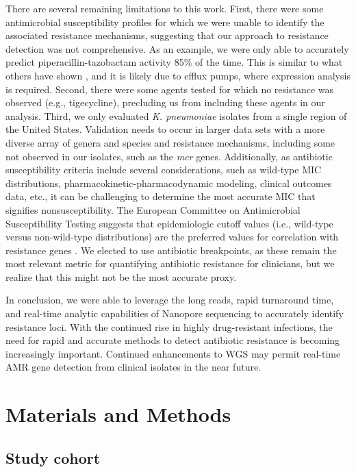 There are several remaining limitations to this work. First, there were some antimicrobial susceptibility profiles for which we were unable to identify the associated resistance mechanisms, suggesting that our approach to resistance detection was not comprehensive. As an example, we were only able to accurately predict piperacillin-tazobactam activity 85\% of the time. This is similar to what others have shown \citep{Shelburne2017-dm}, and it is likely due to efflux pumps, where expression analysis is required. Second, there were some agents tested for which no resistance was observed (e.g., tigecycline), precluding us from including these agents in our analysis. Third, we only evaluated \textit{K. pneumoniae} isolates from a single region of the United States. Validation needs to occur in larger data sets with a more diverse array of genera and species and resistance mechanisms, including some not observed in our isolates, such as the \textit{mcr} genes. Additionally, as antibiotic susceptibility criteria include several considerations, such as wild-type MIC distributions, pharmacokinetic-pharmacodynamic modeling, clinical outcomes data, etc., it can be challenging to determine the most accurate MIC that signifies nonsusceptibility. The European Committee on Antimicrobial Susceptibility Testing suggests that epidemiologic cutoff values (i.e., wild-type versus non-wild-type distributions) are the preferred values for correlation with resistance genes \citep{Eucast_undated-wa}. We elected to use antibiotic breakpoints, as these remain the most relevant metric for quantifying antibiotic resistance for clinicians, but we realize that this might not be the most accurate proxy.

In conclusion, we were able to leverage the long reads, rapid turnaround time, and real-time analytic capabilities of Nanopore sequencing to accurately identify resistance loci. With the continued rise in highly drug-resistant infections, the need for rapid and accurate methods to detect antibiotic resistance is becoming increasingly important. Continued enhancements to WGS may permit real-time AMR gene detection from clinical isolates in the near future.

\section{Materials and Methods}
\label{sec:methods}

\subsection{Study cohort}
\label{sec:cohort}

